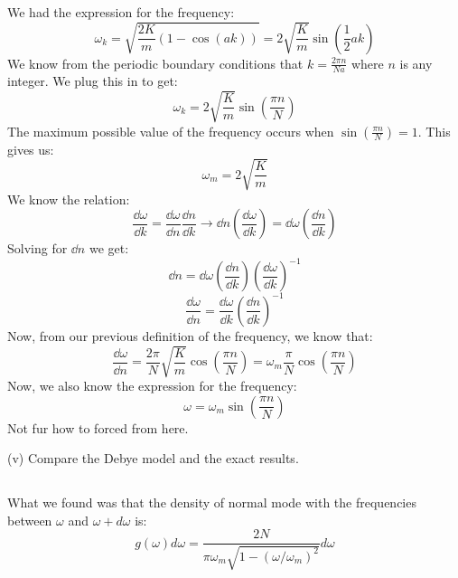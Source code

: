 \documentclass[12pt]{article}
\begin{document}
\subsection{}
We had the expression for the frequency:
\begin{equation}
\omega_k = \sqrt{\frac{2K}{m} (1 - \cos(a k))} = 2 \sqrt{\frac{K}{m}} \sin\left(\frac{1}{2} a k\right)
\end{equation}
We know from the periodic boundary conditions that $k=\frac{2 \pi n}{N a}$ where $n$ is any integer. We plug this in to get:
\begin{equation}
\omega_k = 2 \sqrt{\frac{K}{m}} \sin\left(\frac{\pi n}{N}\right)
\end{equation}
The maximum possible value of the frequency occurs when $\sin \left(\frac{\pi n}{N}\right) = 1$. This gives us:
\begin{equation}
\omega_m = 2 \sqrt{\frac{K}{m}}
\end{equation}
We know the relation:
\begin{equation}
  \frac{\dd{\omega }}{\dd{k}} = \frac{\dd{\omega }}{\dd{n}} \frac{\dd{n}}{\dd{k}} \rightarrow  \dd{n} \left( \frac{\dd{\omega }}{\dd{k} }\right) = \dd{\omega } \left( \frac{\dd{n}}{\dd{k} }\right)
\end{equation}
Solving for $\dd{n}$ we get:
\begin{equation}
  \dd{n} = \dd{\omega } \left( \frac{\dd{n}}{\dd{k} }\right) \left( \frac{\dd{\omega }}{\dd{k} }\right)^{-1}
\end{equation}
\begin{equation}
  \frac{\dd{\omega }}{\dd{n}}= \frac{\dd{\omega }}{\dd{k} }\left( \frac{\dd{n}}{\dd{k} }\right)^{-1}
\end{equation}
Now, from our previous definition of the frequency, we know that:
\begin{equation}
  \frac{\dd{\omega }}{\dd{n}} = \frac{2\pi}{N} \sqrt{\frac{K}{m}} \cos\left(\frac{\pi n}{N}\right) =\omega_{m} \frac{\pi}{N} \cos\left(\frac{\pi n}{N}\right) 
\end{equation}
Now, we also know the expression for the frequency:
\begin{equation}
  \omega =\omega _{m} \sin\left(\frac{\pi n}{N}\right)
\end{equation}
Not fur how to forced from here.

(v) Compare the Debye model and the exact results.
\subsection{}
What we found was that the density of normal mode with the frequencies between $\omega$ and $\omega+d \omega$ is:
\begin{equation}
g(\omega) d \omega=\frac{2 N}{\pi \omega_{m} \sqrt{1-\left(\omega / \omega_{m}\right)^{2}}} d \omega
\end{equation}
\end{document}
